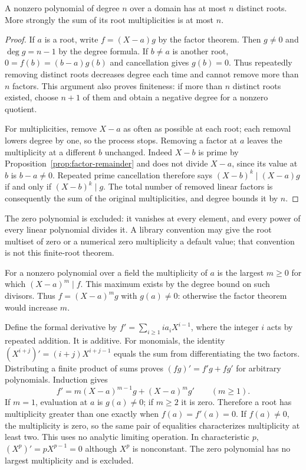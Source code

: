 \begin{theorem}\label{thm:polynomial-root-bound}
A nonzero polynomial of degree $n$ over a domain has at most $n$
distinct roots. More strongly the sum of its root multiplicities is
at most $n$.
\end{theorem}
\begin{proof}
If $a$ is a root, write $f=(X-a)g$ by the factor theorem.
Then $g\ne0$ and $\deg g=n-1$ by the degree formula.
If $b\ne a$ is another root, $0=f(b)=(b-a)g(b)$ and cancellation
gives $g(b)=0$. Thus repeatedly removing distinct roots decreases
degree each time and cannot remove more than $n$ factors.
This argument also proves finiteness: if more than $n$ distinct roots
existed, choose $n+1$ of them and obtain a negative degree for a
nonzero quotient.

For multiplicities, remove $X-a$ as often as possible at each root;
each removal lowers degree by one, so the process stops. Removing a
factor at $a$ leaves the multiplicity at a different $b$ unchanged.
Indeed $X-b$ is prime by Proposition~\ref{prop:factor-remainder} and
does not divide $X-a$, since its value at $b$ is $b-a\ne0$.
Repeated prime cancellation therefore says
$(X-b)^k\mid(X-a)g$ if and only if $(X-b)^k\mid g$.
The total number of removed linear factors is consequently the sum
of the original multiplicities, and degree bounds it by $n$.
\end{proof}
The zero polynomial is excluded: it vanishes at every element, and
every power of every linear polynomial divides it. A library convention
may give the root multiset of zero or a numerical zero multiplicity a
default value; that convention is not this finite-root theorem.

For a nonzero polynomial over a field the multiplicity of $a$ is the
largest $m\ge0$ for which $(X-a)^m\mid f$. This maximum exists by
the degree bound on such divisors. Thus
$f=(X-a)^m g$ with $g(a)\ne0$: otherwise the factor theorem would
increase $m$.

Define the formal derivative by
$f'=\sum_{i\ge1} i a_i X^{i-1}$, where the integer $i$ acts by
repeated addition. It is additive. For monomials, the identity
$(X^{i+j})'=(i+j)X^{i+j-1}$ equals the sum from differentiating
the two factors. Distributing a finite product of sums proves
$(fg)'=f'g+fg'$ for arbitrary polynomials.
Induction gives
\[
 f'=m(X-a)^{m-1}g+(X-a)^m g'\qquad(m\ge1).
\]
If $m=1$, evaluation at $a$ is $g(a)\ne0$; if $m\ge2$ it is zero.
Therefore a root has multiplicity greater than one exactly when
$f(a)=f'(a)=0$. If $f(a)\ne0$, the multiplicity is zero, so the
same pair of equalities characterizes multiplicity at least two.
This uses no analytic limiting operation. In characteristic $p$,
$(X^p)'=pX^{p-1}=0$ although $X^p$ is nonconstant. The zero
polynomial has no largest multiplicity and is excluded.

